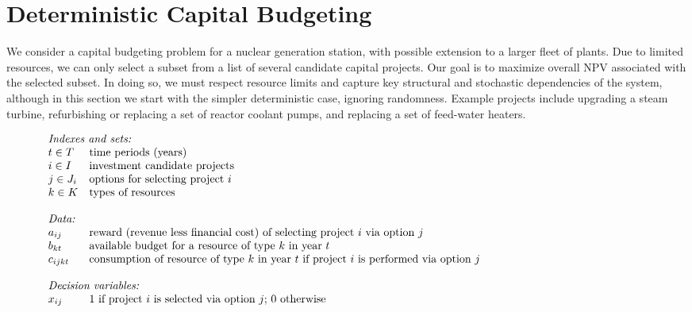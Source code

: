 \section{Deterministic Capital Budgeting}
\label{sec:DeterministicCapitalBudgeting}

We consider a capital budgeting problem for a nuclear generation station, with possible extension to
a larger fleet of plants. Due to limited resources, we can only select a subset from a list of
several candidate capital projects. Our goal is to maximize overall NPV associated with the
selected subset. In doing so, we must respect resource limits and capture key structural and
stochastic dependencies of the system, although in this section we start with the simpler
deterministic case, ignoring randomness.  Example projects include upgrading a steam turbine,
refurbishing or replacing a set of reactor coolant pumps, and replacing a set of feed-water heaters.

\[
\begin{array}{ll}
\multicolumn{2}{l}{\mbox{\em Indexes and sets:} } \\
t \in T  & \mbox{time periods (years)} \\
i \in I  & \mbox{investment candidate projects} \\
j \in J_{i}	& \mbox{options for selecting project $i$} \\%
k \in K	& \mbox{types of resources} \\%
\\
\multicolumn{2}{l}{\mbox{\em Data:}} \\
a_{ij} & \mbox{reward (revenue less financial cost) of selecting project $i$ via option $j$}  \\
b_{kt} & \mbox{available budget for a resource of type $k$ in year $t$}\\
c_{ijkt}  & \mbox{consumption of resource of type $k$ in year $t$ if project $i$ is performed via option $j$} \\
\\
\multicolumn{2}{l}{\mbox{\em Decision variables:}}  \\
x_{ij} & \mbox{1 if project $i$ is selected via option $j$; 0 otherwise} \hspace*{4.0in}\\
\end{array}
\]

